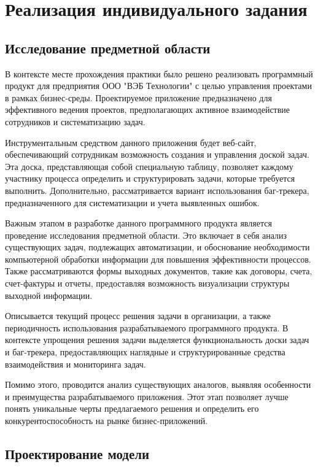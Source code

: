 \documentclass[12pt,a4paper,draft]{report}
\begin{document}
\chapter{Реализация индивидуального задания}

\section{Исследование предметной области}

В контексте месте прохождения практики было решено реализовать программный продукт для предприятия ООО "ВЭБ Технологии" с целью управления проектами в рамках бизнес-среды.
Проектируемое приложение предназначено для эффективного ведения проектов, предполагающих активное взаимодействие сотрудников и систематизацию задач.

Инструментальным средством данного приложения будет веб-сайт, обеспечивающий сотрудникам возможность создания и управления доской задач.
Эта доска, представляющая собой специальную таблицу, позволяет каждому участнику процесса определить и структурировать задачи, которые требуется выполнить.
Дополнительно, рассматривается вариант использования баг-трекера, предназначенного для систематизации и учета выявленных ошибок.

Важным этапом в разработке данного программного продукта является проведение исследования предметной области.
Это включает в себя анализ существующих задач, подлежащих автоматизации, и обоснование необходимости компьютерной обработки информации для повышения эффективности процессов.
Также рассматриваются формы выходных документов, такие как договоры, счета, счет-фактуры и отчеты, предоставляя возможность визуализации структуры выходной информации.

Описывается текущий процесс решения задачи в организации, а также периодичность использования разрабатываемого программного продукта.
В контексте упрощения решения задачи выделяется функциональность доски задач и баг-трекера, предоставляющих наглядные и структурированные средства взаимодействия и мониторинга задач.

Помимо этого, проводится анализ существующих аналогов, выявляя особенности и преимущества разрабатываемого приложения.
Этот этап позволяет лучше понять уникальные черты предлагаемого решения и определить его конкурентоспособность на рынке бизнес-приложений.

\section{Проектирование модели}
\end{document}
